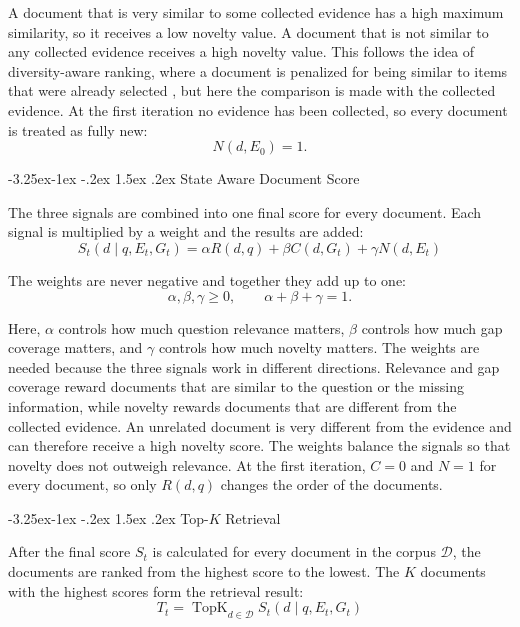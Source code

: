 \documentclass[12pt,a4paper]{report}
\makeatletter
\renewcommand\subsection{\@startsection{subsection}{2}{\z@}%
    {-3.25ex\@plus -1ex \@minus -.2ex}%
    {1.5ex \@plus .2ex}%
    {\normalfont\fontsize{14}{17}\selectfont\bfseries}}
\makeatother
\begin{document}
A document that is very similar to some collected evidence has a high maximum similarity, so it receives a low novelty value. A document that is not similar to any collected evidence receives a high novelty value. This follows the idea of diversity-aware ranking, where a document is penalized for being similar to items that were already selected \cite{carbonell1998mmr,agrawal2009diversifying}, but here the comparison is made with the collected evidence. At the first iteration no evidence has been collected, so every document is treated as fully new:
\[
\boxed{N(d,E_0)=1.}
\tag{6}
\]

\subsection{State Aware Document Score}

The three signals are combined into one final score for every document. Each signal is multiplied by a weight and the results are added:
\[
\boxed{
S_t(d\mid q,E_t,G_t)=
\alpha R(d,q)+\beta C(d,G_t)+\gamma N(d,E_t)
}
\tag{7}
\]

The weights are never negative and together they add up to one:
\[
\boxed{
\alpha,\beta,\gamma\geq0,
\qquad
\alpha+\beta+\gamma=1.
}
\tag{8}
\]

Here, $\alpha$ controls how much question relevance matters, $\beta$ controls how much gap coverage matters, and $\gamma$ controls how much novelty matters. The weights are needed because the three signals work in different directions. Relevance and gap coverage reward documents that are similar to the question or the missing information, while novelty rewards documents that are different from the collected evidence. An unrelated document is very different from the evidence and can therefore receive a high novelty score. The weights balance the signals so that novelty does not outweigh relevance. At the first iteration, $C=0$ and $N=1$ for every document, so only $R(d,q)$ changes the order of the documents.

\subsection{Top-$K$ Retrieval}

After the final score $S_t$ is calculated for every document in the corpus $\mathcal{D}$, the documents are ranked from the highest score to the lowest. The $K$ documents with the highest scores form the retrieval result:
\[
\boxed{
T_t=\operatorname{TopK}_{d\in\mathcal{D}} S_t(d\mid q,E_t,G_t)
}
\tag{9}
\]
\end{document}
